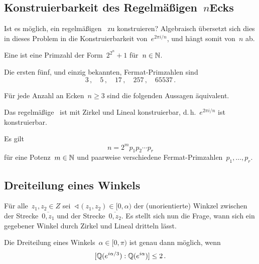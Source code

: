 \subsection{Konstruierbarkeit des Regelmäßigen~\texorpdfstring{$n$}-Ecks}

Ist es möglich, ein regelmäßigen~ zu konstruieren?
Algebraisch übersetzt sich dies in dieses Problem in die Konstruierbarkeit von~$e^{2 \pi i / n}$, und hängt somit von~$n$ ab.

\begin{definition}
  Eine  ist eine Primzahl der Form~$2^{2^n} + 1$ für~$n \in \mathbb{N}$.
\end{definition}

\begin{example}
  Die ersten fünf, und einzig bekannten, Fermat-Primzahlen sind
  \[
    3 \,,
    \quad
    5 \,,
    \quad
    17 \,,
    \quad
    257 \,,
    \quad
    65537 \,.
  \]
\end{example}

\begin{theorem}[Gauß]
  Für jede Anzahl an Ecken~$n \geq 3$ sind die folgenden Aussagen äquivalent.
  \begin{equivlist}
    \item
      Das regelmäßige~ ist mit Zirkel und Lineal konstruierbar, d.\,h.~$e^{2 \pi i / n}$ ist konstruierbar.
    \item
      Es gilt
      \[
        n = 2^m p_1 p_2 \dotsm p_r
      \]
      für eine Potenz~$m \in \mathbb{N}$ und paarweise verschiedene Fermat-Primzahlen~$p_1, \dotsc, p_r$.
  \end{equivlist}
\end{theorem}



\subsection{Dreiteilung eines Winkels}

Für alle~$z_1, z_2 \in Z$ sei~$\sphericalangle(z_1, z_2) \in [0, \alpha)$ der (unorientierte) Winkzel zwischen der Strecke~$\overline{0,z_1}$ und der Strecke~$\overline{0,z_2}$.
Es stellt sich nun die Frage, wann sich ein gegebener Winkel durch Zirkel und Lineal dritteln lässt.

\begin{proposition}
  Die Dreiteilung eines Winkels~$\alpha \in [0, \pi)$ ist genau dann möglich, wenn
  \[
    [ \mathbb{Q}( e^{i \alpha / 3}  ) : \mathbb{Q}( e^{i \alpha} ) ]
    \leq 2
    \,.
  \]
\end{proposition}





